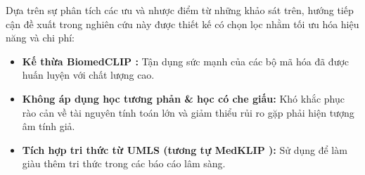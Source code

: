 \begin{refsection}
Dựa trên sự phân tích các ưu và nhược điểm từ những khảo sát trên, hướng tiếp cận đề xuất trong nghiên cứu này được thiết kế có chọn lọc nhằm tối ưu hóa hiệu năng và chi phí:
  \begin{itemize}
      \item \textbf{Kế thừa BiomedCLIP \cite{BiomedCLIP}:} Tận dụng sức mạnh của các bộ mã hóa đã được huấn luyện với chất lượng cao.
      \item \textbf{Không áp dụng học tương phản \& học có che giấu:} Khó khắc phục rào cản về tài nguyên tính toán lớn và giảm thiểu rủi ro gặp phải hiện tượng âm tính giả.
      \item \textbf{Tích hợp tri thức từ UMLS (tương tự MedKLIP \cite{MedKLIP}):} Sử dụng để làm giàu thêm tri thức trong các báo cáo lâm sàng.
  \end{itemize}


\end{refsection}
